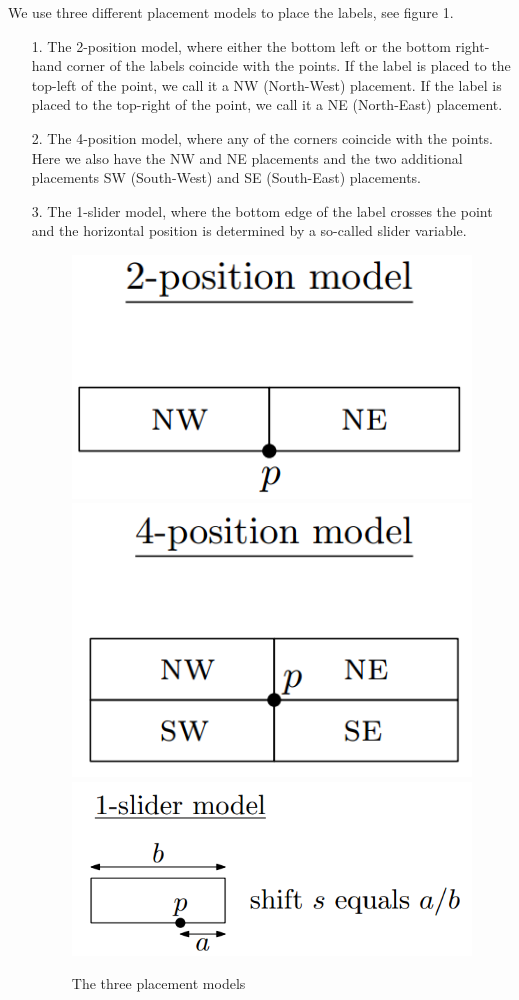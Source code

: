 \documentclass[crop=false,a4paper,oneside,11pt]{standalone}
\begin{document}
 We use three different placement models to place the labels, see figure 1.
 \begin{enumerate}
 \item[1.] The 2-position model, where either the bottom left or the bottom right-hand corner of the labels coincide with the points. If the label is placed to the top-left of the point, we call it a NW (North-West) placement. If the label is placed to the top-right of the point, we call it a NE (North-East) placement.
 \item[2.] The 4-position model, where any of the corners coincide with the points. Here we also have the NW and NE placements and the two additional placements SW (South-West) and SE (South-East) placements.
 \item[3.] The 1-slider model, where the bottom edge of the label crosses the point and the horizontal position is determined by a so-called slider variable.
 \begin{figure}[h!]
 \includegraphics[scale = 0.5]{2pos.png} \includegraphics[scale = 0.5]{4pos.png} \includegraphics[scale = 0.5]{1slider.png}\\
 \caption{The three placement models}
 \end{figure}
 \end{enumerate}
\end{document}
